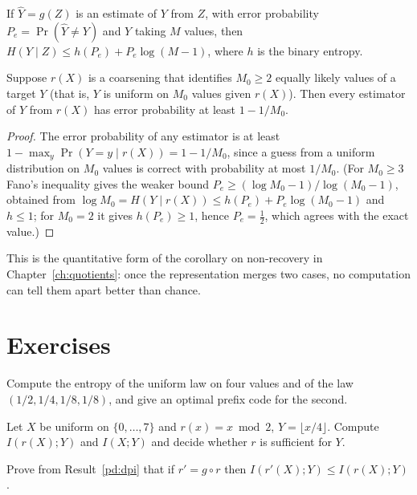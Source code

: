 \begin{established}[Fano]\label{pd:fano}
If $\hat Y=g(Z)$ is an estimate of $Y$ from $Z$, with error probability $P_e=\Pr(\hat Y\ne Y)$ and $Y$ taking $M$ values, then $H(Y\mid Z)\le h(P_e)+P_e\log(M-1)$, where $h$ is the binary entropy.
\end{established}

\begin{newresult}\label{pd:recover}
Suppose $r(X)$ is a coarsening that identifies $M_0\ge2$ equally likely values of a target $Y$ (that is, $Y$ is uniform on $M_0$ values given $r(X)$). Then every estimator of $Y$ from $r(X)$ has error probability at least $1-1/M_0$.
\end{newresult}
\begin{proof}
The error probability of any estimator is at least $1-\max_y\Pr(Y=y\mid r(X))=1-1/M_0$, since a guess from a uniform distribution on $M_0$ values is correct with probability at most $1/M_0$. (For $M_0\ge3$ Fano's inequality gives the weaker bound $P_e\ge(\log M_0-1)/\log(M_0-1)$, obtained from $\log M_0=H(Y\mid r(X))\le h(P_e)+P_e\log(M_0-1)$ and $h\le1$; for $M_0=2$ it gives $h(P_e)\ge1$, hence $P_e=\tfrac12$, which agrees with the exact value.)
\end{proof}

This is the quantitative form of the corollary on non-recovery in Chapter~\ref{ch:quotients}: once the representation merges two cases, no computation can tell them apart better than chance.

\section*{Exercises}

\begin{exercise}
Compute the entropy of the uniform law on four values and of the law $(1/2,1/4,1/8,1/8)$, and give an optimal prefix code for the second.
\end{exercise}

\begin{exercise}
Let $X$ be uniform on $\{0,\dots,7\}$ and $r(x)=x\bmod2$, $Y=\lfloor x/4\rfloor$. Compute $I(r(X);Y)$ and $I(X;Y)$ and decide whether $r$ is sufficient for $Y$.
\end{exercise}

\begin{exercise}
Prove from Result~\ref{pd:dpi} that if $r'=g\circ r$ then $I(r'(X);Y)\le I(r(X);Y)$.
\end{exercise}

